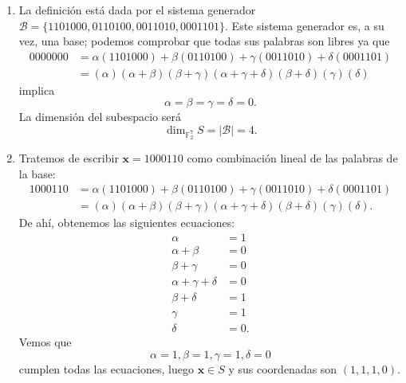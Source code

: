 \begin{enumerate}[label=\alph*)]
	\item La definición está dada por el sistema generador $\mathcal{B} = \{1101000, 0110100, 0011010, 0001101\}$. Este sistema generador es, a su vez, una base; podemos comprobar que todas sus palabras son libres ya que
	\begin{align*}
		0000000 &= \alpha(1101000) + \beta(0110100) + \gamma(0011010) + \delta(0001101)\\
		&= (\alpha)(\alpha+\beta)(\beta+\gamma)(\alpha+\gamma+\delta)(\beta+\delta)(\gamma)(\delta)
	\end{align*}
	implica
	\[\alpha=\beta=\gamma=\delta=0.\]
	La dimensión del subespacio será
	\[\dim_{\mathbb{F}_2^7}S = |\mathcal{B}| = 4.\]
	
	\item Tratemos de escribir $\textbf{x} = 1000110$ como combinación lineal de las palabras de la base:
	\begin{align*}
		1000110 &= \alpha(1101000) + \beta(0110100) + \gamma(0011010) + \delta(0001101)\\
		&= (\alpha)(\alpha+\beta)(\beta+\gamma)(\alpha+\gamma+\delta)(\beta+\delta)(\gamma)(\delta).
	\end{align*}
	De ahí, obtenemos las siguientes ecuaciones:
	\begin{align*}
		\alpha &= 1\\
		\alpha+\beta &= 0\\
		\beta+\gamma &= 0\\
		\alpha+\gamma+\delta &= 0\\
		\beta+\delta &= 1\\
		\gamma &= 1\\
		\delta &= 0.
	\end{align*}
	Vemos que
	\[\alpha=1, \beta=1, \gamma=1, \delta=0\]
	cumplen todas las ecuaciones, luego $\textbf{x}\in S$ y sus coordenadas son $(1,1,1,0)$.
\end{enumerate}
